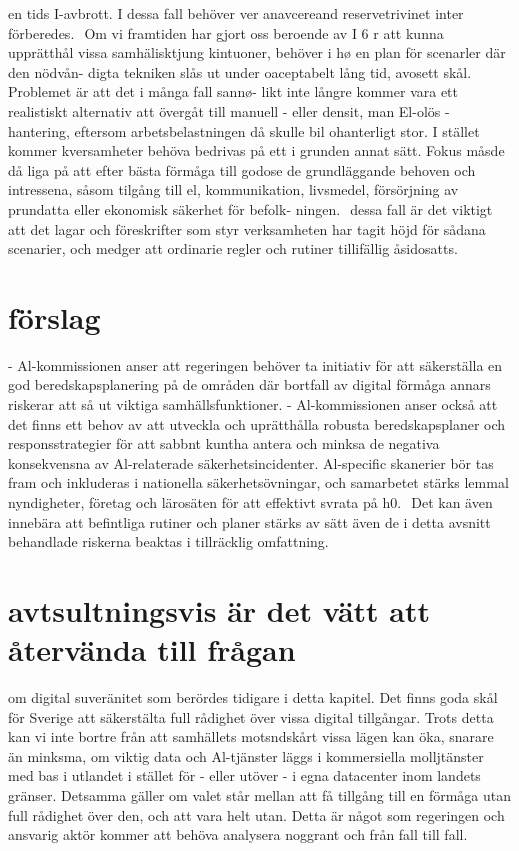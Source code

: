 {{{{{{{{{{{{{{{{en tids I-avbrott. I dessa fall behöver ver anavcereand
reservetrivinet inter förberedes. \({ }^{}\)
Om vi framtiden har gjort oss beroende av I 6 r att
kunna upprätthål vissa samhälisktjung kintuoner,
behöver i hø en plan för scenarler där den nödvån-
digta tekniken slås ut under oaceptabelt lång tid,
avosett skål. Problemet är att det i många fall sannø-
likt inte långre kommer vara ett realistiskt alternativ
att övergåt till manuell - eller densit, man El-olös
- hantering, eftersom arbetsbelastningen då skulle
bil ohanterligt stor. I stället kommer kversamheter
behöva bedrivas på ett i grunden annat sätt. Fokus
måsde då liga på att efter bästa förmåga till godose
de grundläggande behoven och intressena, såsom
tilgång till el, kommunikation, livsmedel, försörjning
av prundatta eller ekonomisk säkerhet för befolk-
ningen. \({ }^{}\) dessa fall är det viktigt att det lagar och
föreskrifter som styr verksamheten har tagit höjd för
sådana scenarier, och medger att ordinarie regler och
rutiner tillifällig åsidosatts.
\section*{förslag}
- Al-kommissionen anser att regeringen
behöver ta initiativ för att säkerställa en god
beredskapsplanering på de områden där bortfall
av digital förmåga annars riskerar att så ut viktiga
samhällsfunktioner.
- Al-kommissionen anser också att det finns ett
behov av att utveckla och uprätthålla robusta
beredskapsplaner och responsstrategier
för att sabbnt kuntha antera och minksa de
negativa konsekvensna av Al-relaterade
säkerhetsincidenter. Al-specific skanerier
bör tas fram och inkluderas i nationella
säkerhetsövningar, och samarbetet stärks
lemmal nyndigheter, företag och lärosäten för att
effektivt svrata på h0. \({ }^{}\) Det kan även innebära
att befintliga rutiner och planer stärks av sätt även
de i detta avsnitt behandlade riskerna beaktas i
tillräcklig omfattning.
\section*{avtsultningsvis är det vätt att återvända till frågan}
om digital suveränitet som berördes tidigare i detta
kapitel. Det finns goda skål för Sverige att säkerstälta
full rådighet över vissa digital tillgångar. Trots detta
kan vi inte bortre från att samhällets motsndskårt
vissa lägen kan öka, snarare än minksma, om viktig
data och Al-tjänster läggs i kommersiella molljtänster
med bas i utlandet i stället för - eller utöver - i egna
datacenter inom landets gränser. Detsamma gäller
om valet står mellan att få tillgång till en förmåga utan
full rådighet över den, och att vara helt utan. Detta är
något som regeringen och ansvarig aktör kommer att
behöva analysera noggrant och från fall till fall.
}}}}}}}}}}}}}}}}
